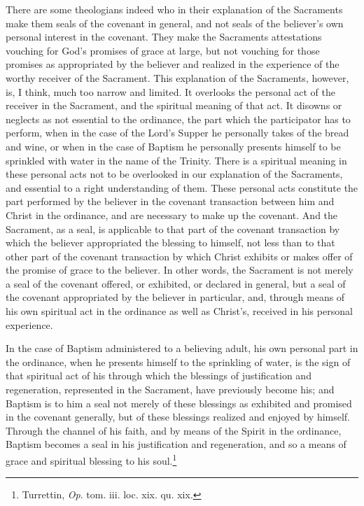 \documentclass[english,]{book}
\begin{document}
There are some theologians indeed who in their explanation of the Sacraments make them seals of the covenant in general, and not seals of the believer's own personal interest in the covenant. They make the Sacraments attestations vouching for God's promises of grace at large, but not vouching for those promises as appropriated by the believer and realized in the experience of the worthy receiver of the Sacrament. This explanation of the Sacraments, however, is, I think, much too narrow and limited. It overlooks the personal act of the receiver in the Sacrament, and the spiritual meaning of that act. It disowns or neglects as not essential to the ordinance, the part which the participator has to perform, when in the case of the Lord's Supper he personally takes of the bread and wine, or when in the case of Baptism he personally presents himself to be sprinkled with water in the name of the Trinity. There is a spiritual meaning in these personal acts not to be overlooked in our explanation of the Sacraments, and essential to a right understanding of them. These personal acts constitute the part performed by the believer in the covenant transaction between him and Christ in the ordinance, and are necessary to make up the covenant. And the Sacrament, as a seal, is applicable to that part of the covenant transaction by which the believer appropriated the blessing to himself, not less than to that other part of the covenant transaction by which Christ exhibits or makes offer of the promise of grace to the believer. In other words, the Sacrament is not merely a seal of the covenant offered, or exhibited, or declared in general, but a seal of the covenant appropriated by the believer in particular, and, through means of his own spiritual act in the ordinance as well as Christ's, received in his personal experience.

In the case of Baptism administered to a believing adult, his own personal part in the ordinance, when he presents himself to the sprinkling of water, is the sign of that spiritual act of his through which the blessings of justification and regeneration, represented in the Sacrament, have previously become his; and Baptism is to him a seal not merely of these blessings as exhibited and promised in the covenant generally, but of these blessings realized and enjoyed by himself. Through the channel of his faith, and by means of the Spirit in the ordinance, Baptism becomes a seal in his justification and regeneration, and so a means of grace and spiritual blessing to his soul.\footnote{Turrettin, \emph{Op}. tom. iii. loc. xix. qu. xix.}
\end{document}
